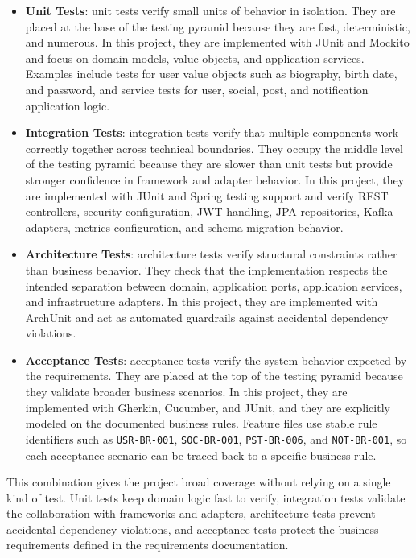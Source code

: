 \documentclass[12pt,a4paper]{article}
\begin{document}
\begin{itemize}
    \item \textbf{Unit Tests}: unit tests verify small units of behavior in isolation. They are placed at the base of the testing pyramid because they are fast, deterministic, and numerous. In this project, they are implemented with JUnit and Mockito and focus on domain models, value objects, and application services. Examples include tests for user value objects such as biography, birth date, and password, and service tests for user, social, post, and notification application logic.
    \item \textbf{Integration Tests}: integration tests verify that multiple components work correctly together across technical boundaries. They occupy the middle level of the testing pyramid because they are slower than unit tests but provide stronger confidence in framework and adapter behavior. In this project, they are implemented with JUnit and Spring testing support and verify REST controllers, security configuration, JWT handling, JPA repositories, Kafka adapters, metrics configuration, and schema migration behavior.
    \item \textbf{Architecture Tests}: architecture tests verify structural constraints rather than business behavior. They check that the implementation respects the intended separation between domain, application ports, application services, and infrastructure adapters. In this project, they are implemented with ArchUnit and act as automated guardrails against accidental dependency violations.
    \item \textbf{Acceptance Tests}: acceptance tests verify the system behavior expected by the requirements. They are placed at the top of the testing pyramid because they validate broader business scenarios. In this project, they are implemented with Gherkin, Cucumber, and JUnit, and they are explicitly modeled on the documented business rules. Feature files use stable rule identifiers such as \texttt{USR-BR-001}, \texttt{SOC-BR-001}, \texttt{PST-BR-006}, and \texttt{NOT-BR-001}, so each acceptance scenario can be traced back to a specific business rule.
\end{itemize}

This combination gives the project broad coverage without relying on a single kind of test. Unit tests keep domain logic fast to verify, integration tests validate the collaboration with frameworks and adapters, architecture tests prevent accidental dependency violations, and acceptance tests protect the business requirements defined in the requirements documentation.
\end{document}
